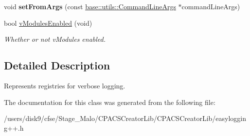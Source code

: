 \begin{DoxyCompactItemize}
\item 
\hypertarget{classel_1_1base_1_1VRegistry_a811e62d7d016a0714b4363f47216a9da}{void {\bfseries set\-From\-Args} (const \hyperlink{classel_1_1base_1_1utils_1_1CommandLineArgs}{base\-::utils\-::\-Command\-Line\-Args} $\ast$command\-Line\-Args)}\label{classel_1_1base_1_1VRegistry_a811e62d7d016a0714b4363f47216a9da}

\item 
\hypertarget{classel_1_1base_1_1VRegistry_ad7a8e939daf6b3d6b949def0a9f65a1f}{bool \hyperlink{classel_1_1base_1_1VRegistry_ad7a8e939daf6b3d6b949def0a9f65a1f}{v\-Modules\-Enabled} (void)}\label{classel_1_1base_1_1VRegistry_ad7a8e939daf6b3d6b949def0a9f65a1f}

\begin{DoxyCompactList}\small\item\em Whether or not v\-Modules enabled. \end{DoxyCompactList}\end{DoxyCompactItemize}


\subsection{Detailed Description}
Represents registries for verbose logging. 

The documentation for this class was generated from the following file\-:\begin{DoxyCompactItemize}
\item 
/users/disk9/cfse/\-Stage\-\_\-\-Malo/\-C\-P\-A\-C\-S\-Creator\-Lib/\-C\-P\-A\-C\-S\-Creator\-Lib/easylogging++.\-h\end{DoxyCompactItemize}
